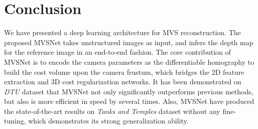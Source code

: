 \documentclass[runningheads]{llncs}
\begin{document}
\section{Conclusion}
We have presented a deep learning architecture for MVS reconstruction. The proposed MVSNet takes unstructured images as input, and infers the depth map for the reference image in an end-to-end fashion. The core contribution of MVSNet is to encode the camera parameters as the differentiable homography to build the cost volume upon the camera frustum, which bridges the 2D feature extraction and 3D cost regularization networks. It has been demonstrated on \textit{DTU} dataset that MVSNet not only significantly outperforms previous methods, but also is more efficient in speed by several times. Also, MVSNet have produced the state-of-the-art results on \textit{Tanks and Temples} dataset without any fine-tuning, which demonstrates its strong generalization ability.




\end{document}

